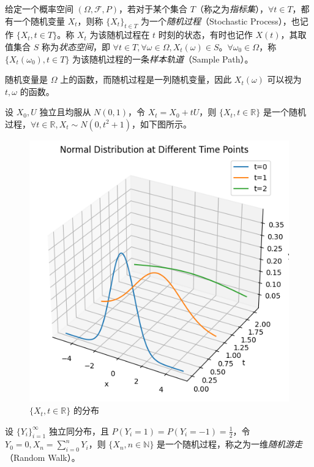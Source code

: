 \documentclass[../main.tex]{subfiles}
\begin{document}
\begin{definition*}
    给定一个概率空间 $(\Omega,\mathcal F,P)$，若对于某个集合 $T$（称之为\emph{指标集}），$\forall t\in T$，都有一个随机变量 $X_t$，则称 $\{X_t\}_{t\in T}$ 为一个\emph{随机过程}（Stochastic Process），也记作 $\{X_t,t\in T\}$。称 $X_t$ 为该随机过程在 $t$ 时刻的状态，有时也记作 $X(t)$，其取值集合 $S$ 称为\emph{状态空间}，即 $\forall t\in T,\forall \omega\in\Omega,X_t(\omega)\in S$。$\forall\omega_0\in\Omega$，称 $\{X_t(\omega_0),t\in T\}$ 为该随机过程的一条\emph{样本轨道}（Sample Path）。
\end{definition*}

随机变量是 $\Omega$ 上的函数，而随机过程是一列随机变量，因此 $X_t(\omega)$ 可以视为 $t,\omega$ 的函数。

\begin{example*}
    设 $X_0,U$ 独立且均服从 $N(0,1)$，令 $X_t=X_0+tU$，则 $\{X_t,t\in\mathbb R\}$ 是一个随机过程，$\forall t\in\mathbb R,X_t\sim N(0,t^2+1)$，如下图所示。
\end{example*}

\begin{figure}[!h]
    \centering
    \includegraphics[scale=0.7]{figures/SP_exp1.png}
    \caption*{$\{X_t,t\in\mathbb R\}$ 的分布}
\end{figure}

\begin{example*}
    设 $\{Y_i\}_{i=1}^\infty$ 独立同分布，且 $P(Y_i=1)=P(Y_i=-1)=\frac12$，令 $Y_0=0,X_n=\sum_{i=0}^nY_i$，则 $\{X_n,n\in\mathbb N\}$ 是一个随机过程，称之为一维\emph{随机游走}（Random Walk）。
\end{example*}
\end{document}
